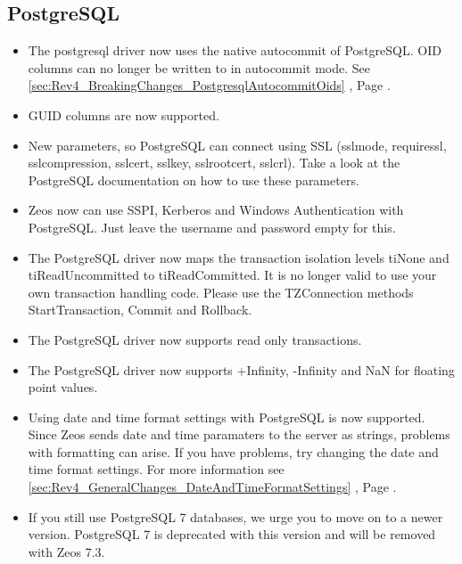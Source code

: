 \documentclass[a4paper,12pt,oneside]{book}
\begin{document}
\subsection{PostgreSQL}
\label{sec:Rev4_DriverSpecificChanges_Postgresql}
\begin{itemize}
\item 
  The postgresql driver now uses the native autocommit of PostgreSQL. 
	OID columns can no longer be written to in autocommit mode.
	See \ref{sec:Rev4_BreakingChanges_PostgresqlAutocommitOids} , Page \pageref{sec:Rev4_BreakingChanges_PostgresqlAutocommitOids}.
\item GUID columns are now supported.
\item 
  New parameters, so PostgreSQL can connect using SSL (sslmode, requiressl, sslcompression, sslcert, sslkey, sslrootcert, sslcrl). 
	Take a look at the PostgreSQL documentation on how to use these parameters.
\item
  Zeos now can use SSPI, Kerberos and Windows Authentication with PostgreSQL.
	Just leave the username and password empty for this.
\item
  The PostgreSQL driver now maps the transaction isolation levels tiNone and tiReadUncommitted to tiReadCommitted.
	It is no longer valid to use your own transaction handling code.
	Please use the TZConnection methods StartTransaction, Commit and Rollback.
\item
  The PostgreSQL driver now supports read only transactions.
\item
  The PostgreSQL driver now supports +Infinity, -Infinity and NaN for floating point values.
\item
  Using date and time format settings with PostgreSQL is now supported.
  Since Zeos sends date and time paramaters to the server as strings, problems with formatting can arise.
	If you have problems, try changing the date and time format settings.
	For more information see \ref{sec:Rev4_GeneralChanges_DateAndTimeFormatSettings} , Page \pageref{sec:Rev4_GeneralChanges_DateAndTimeFormatSettings}.
\item
  If you still use PostgreSQL 7 databases, we urge you to move on to a newer version.
	PostgreSQL 7 is deprecated with this version and will be removed with Zeos 7.3.
\end{itemize}
\end{document}
